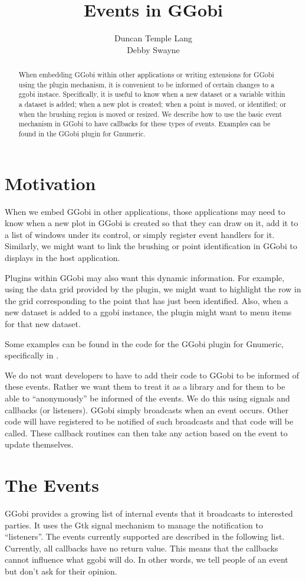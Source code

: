 \documentclass{article}
\title{Events in GGobi}
\author{
Duncan Temple Lang \\
Debby Swayne
}
\def\GGobiPlugin#1{\textsl{\Escape{#1}}}
\begin{document}
\maketitle
\begin{abstract}
  When embedding GGobi within other applications or writing extensions
  for GGobi using the plugin mechanism, it is convenient to be
  informed of certain changes to a ggobi instace.  Specifically, it is
  useful to know when a new dataset or a variable within a dataset is
  added; when a new plot is created; when a point is moved, or
  identified; or when the brushing region is moved or resized.
  We describe how to use the basic event mechanism in GGobi
  to have callbacks for these types of events.
  Examples can be found in the GGobi plugin for Gnumeric.
\end{abstract}

\section{Motivation}
When we embed GGobi in other applications, those applications may need
to know when a new plot in GGobi is created so that they can draw on
it, add it to a list of windows under its control, or simply register
event handlers for it.  Similarly, we might want to link the brushing
or point identification in GGobi to displays in the host application.

Plugins within GGobi may also want this dynamic information.  For
example, using the data grid provided by the \GGobiPlugin{DataViewer}
plugin, we might want to highlight the row in the grid corresponding
to the point that has just been identified.  Also, when a new dataset
is added to a ggobi instance, the plugin might want to menu items for
that new dataset.

Some examples can be found in the code for the GGobi plugin for
Gnumeric, specifically in .

We do not want developers to have to add their code to GGobi to be
informed of these events.  Rather we want them to treat it as a
library and for them to be able to ``anonymously'' be informed of the
events. We do this using signals and callbacks (or listeners).  GGobi
simply broadcasts when an event occurs.  Other code will have
registered to be notified of such broadcasts and that code will be
called. These callback routines can then take any action based on the
event to update themselves.

\section{The Events}
GGobi provides a growing list of internal events that it broadcasts to
interested parties. It uses the Gtk signal mechanism to manage the
notification to ``listeners''.  The events currently supported are
described in the following list.  Currently, all callbacks have no
return value.  This means that the callbacks cannot influence what
ggobi will do. In other words, we tell people of an event but don't
ask for their opinion.
\end{document}
